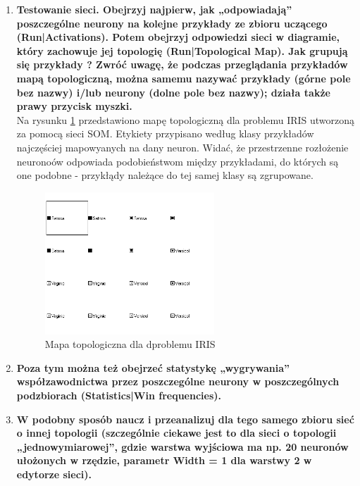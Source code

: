 \begin{enumerate}
\item \textbf{
Testowanie sieci. Obejrzyj najpierw, jak „odpowiadają” poszczególne neurony na kolejne przykłady ze zbioru uczącego (Run|Activations). Potem obejrzyj odpowiedzi sieci w diagramie, który zachowuje jej topologię (Run|Topological Map).  Jak grupują się przykłady ?
Zwróć uwagę, że podczas przeglądania przykładów mapą topologiczną, można samemu nazywać przykłady (górne pole bez nazwy) i/lub neurony (dolne pole bez nazwy); działa także prawy przycisk myszki.}
\\Na rysunku \ref{fig:map-iris} przedstawiono mapę topologiczną dla problemu IRIS utworzoną za pomocą sieci SOM. Etykiety przypisano według klasy przykładów najczęściej mapowyanych na dany neuron. Widać, że przestrzenne rozłożenie neuronoów odpowiada podobieństwom między przykładami, do których są one podobne - przykłądy należące do tej samej klasy są zgrupowane.
\begin{figure}[h]
\begin{centering}
\includegraphics[width=0.6\textwidth]{dane/part3/zad1/map-iris}
\caption{Mapa topologiczna dla dproblemu IRIS\label{fig:map-iris}}
\end{centering}
\end{figure}


\item \textbf{
Poza tym można też obejrzeć statystykę „wygrywania” współzawodnictwa przez poszczególne neurony w poszczególnych podzbiorach (Statistics|Win frequencies).}

\item \textbf{
W podobny sposób naucz i przeanalizuj dla tego samego zbioru sieć o innej topologii (szczególnie ciekawe jest to dla sieci o topologii „jednowymiarowej”, gdzie warstwa wyjściowa ma np. 20 neuronów ułożonych w rzędzie, parametr Width = 1 dla warstwy 2 w edytorze sieci).}
	
\end{enumerate}

